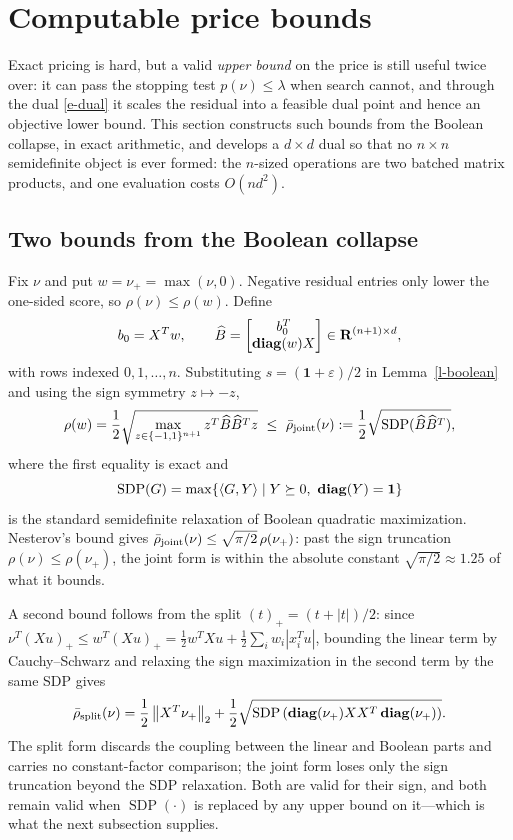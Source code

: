 \documentclass[12pt]{article}
\theoremstyle{plain}
\theoremstyle{definition}
\newcommand{\reals}{\mathbf{R}}
\newcommand{\norm}[1]{\left\lVert #1\right\rVert}
\newcommand{\ip}[2]{\left\langle #1,#2\right\rangle}
\newcommand{\relu}[1]{\left(#1\right)_+}
\newcommand{\ones}{\mathbf{1}}
\newcommand{\diag}{\mathop{\bf diag}}
\begin{document}
\section{Computable price bounds}\label{s-bounds}

Exact pricing is hard, but a valid \emph{upper bound} on the price is still
useful twice over: it can pass the stopping test $p(\nu)\le\lambda$ when
search cannot, and through the dual \eqref{e-dual} it scales the residual into
a feasible dual point and hence an objective lower bound. This section
constructs such bounds from the Boolean collapse, in exact arithmetic, and
develops a $d\times d$ dual so that no $n\times n$ semidefinite object is ever
formed: the $n$-sized operations are two batched matrix products, and one
evaluation costs $O(nd^2)$.

\subsection{Two bounds from the Boolean collapse}

Fix $\nu$ and put $w=\nu_+=\max(\nu,0)$. Negative residual entries only lower
the one-sided score, so $\rho(\nu)\le\rho(w)$. Define
\[
  b_0=X^Tw,
  \qquad
  \widehat B=\begin{bmatrix}b_0^T\\ \diag(w)X\end{bmatrix}\in
  \reals^{(n+1)\times d},
\]
with rows indexed $0,1,\ldots,n$. Substituting $s=(\ones+\varepsilon)/2$ in
Lemma~\ref{l-boolean} and using the sign symmetry $z\mapsto-z$,
\[
  \rho(w)
  =\frac12\sqrt{\max_{z\in\{-1,1\}^{n+1}}z^T\widehat B\widehat B^Tz}
  \ \le\
  \bar\rho_{\rm joint}(\nu)
  :=\frac12\sqrt{\operatorname{SDP}(\widehat B\widehat B^T)},
\]
where the first equality is exact and
\[
  \operatorname{SDP}(G)
  =\max\{\ip{G}{Y} \mid Y\succeq0,\ \diag(Y)=\ones\}
\]
is the standard semidefinite relaxation of Boolean quadratic maximization.
Nesterov's bound \citep{nesterov1998semidefinite} gives
$\bar\rho_{\rm joint}(\nu)\le\sqrt{\pi/2}\,\rho(\nu_+)$: past the sign
truncation $\rho(\nu)\le\rho(\nu_+)$, the joint form is within the absolute
constant $\sqrt{\pi/2}\approx1.25$ of what it bounds.

A second bound follows from the split $\relu t=(t+|t|)/2$: since
$\nu^T\relu{Xu}\le w^T\relu{Xu}=\tfrac12w^TXu+\tfrac12\sum_iw_i|x_i^Tu|$,
bounding the linear term by Cauchy--Schwarz and relaxing the sign
maximization in the second term by the same SDP gives
\[
 \bar\rho_{\rm split}(\nu)
 =\frac12\norm{X^T\nu_+}_2
  +\frac12\sqrt{\operatorname{SDP}
  \left(\diag(\nu_+)XX^T\diag(\nu_+)\right)} .
\]
The split form discards the coupling between the linear and Boolean parts and
carries no constant-factor comparison; the joint form loses only the sign
truncation beyond the SDP relaxation. Both are valid for their sign, and both
remain valid when $\operatorname{SDP}(\cdot)$ is replaced by any upper bound
on it---which is what the next subsection supplies.
\end{document}
